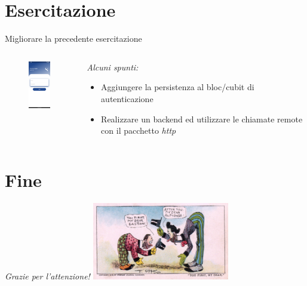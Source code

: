 \documentclass{../libs/presentation_format}
\begin{document}

\section{Esercitazione}
\begin{frame}{Migliorare la precedente esercitazione}
	\begin{minipage}[0.2\textheight]{\textwidth}
		\begin{columns}[T]
			\begin{column}{0.4\textwidth}
				\begin{figure}[htpb]
					\centering
					\includegraphics[width=2cm]{../libs/login-page}
				\end{figure}
			\end{column}
			\begin{column}{0.6\textwidth}
				\emph{Alcuni spunti:}
				\begin{itemize}
					\item Aggiungere la persistenza al bloc/cubit di autenticazione
					\item Realizzare un backend ed utilizzare le chiamate remote con il pacchetto \emph{http}
				\end{itemize}
			\end{column}
		\end{columns}
	\end{minipage}
\end{frame}



\section{Fine}
\begin{frame}{}
	\huge\emph{Grazie per l'attenzione!}
	\newline
	\vfill
	\hfill\includegraphics[width=6cm]{../libs/alphonse-gaston-regards}
\end{frame}
\end{document}
